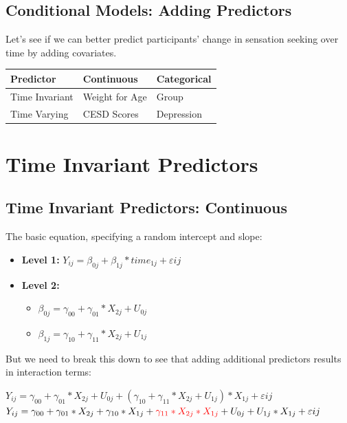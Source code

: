\documentclass[]{article}
\begin{document}
\normalsize
\raggedright

\subsection{Conditional Models: Adding
Predictors}\label{conditional-models-adding-predictors}

Let's see if we can better predict participants' change in sensation
seeking over time by adding covariates.

\begin{longtable}[]{@{}lll@{}}
\toprule
Predictor & Continuous & Categorical\tabularnewline
\midrule
\endhead
Time Invariant & Weight for Age & Group\tabularnewline
Time Varying & CESD Scores & Depression\tabularnewline
\bottomrule
\end{longtable}

\section{Time Invariant Predictors}\label{time-invariant-predictors}

\subsection{Time Invariant Predictors:
Continuous}\label{time-invariant-predictors-continuous}

The basic equation, specifying a random intercept and slope:\\

\begin{itemize}
  \item \textbf{Level 1:} $Y_{ij} = \beta_{0j} + \beta_{1j}*time_{1j} + \varepsilon{ij}$
  \item \textbf{Level 2:} 
    \begin{itemize} 
      \item $\beta_{0j} = \gamma_{00} + \gamma_{01}*X_{2j} + U_{0j}$
      \item $\beta_{1j} = \gamma_{10} + \gamma_{11}*X_{2j} + U_{1j}$
    \end{itemize}
\end{itemize}

But we need to break this down to see that adding additional predictors
results in interaction terms:

\(Y_{ij} = \gamma_{00} + \gamma_{01}*X_{2j} + U_{0j} + (\gamma_{10} + \gamma_{11}*X_{2j} + U_{1j})*X_{1j} + \varepsilon{ij}\)
\(Y_{ij} = \gamma_{00} + \gamma_{01}*X_{2j} + \gamma_{10}*X_{1j} + \textcolor{red}{\gamma_{11}*X_{2j}*X_{1j}} + U_{0j} + U_{1j}*X_{1j} + \varepsilon{ij}\)
\end{document}
